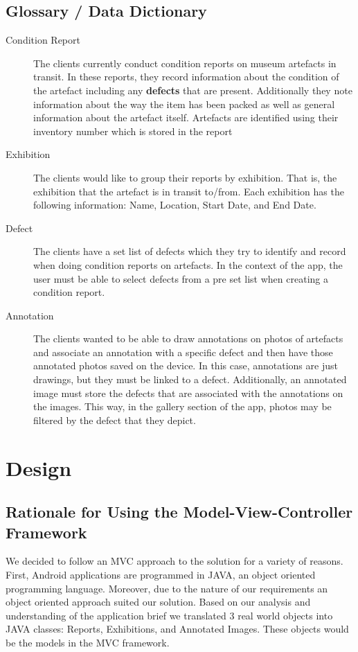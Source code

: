 \documentclass[12pt]{article}
\begin{document}
\subsection{Glossary / Data Dictionary}
\begin{description}
\item [Condition Report] The clients currently conduct condition reports on museum artefacts in transit. In these reports, they record information about the condition of the artefact including any \textbf{defects} that are present. Additionally they note information about the way the item has been packed as well as general information about the artefact itself. Artefacts are identified using their inventory number which is stored in the report

\item [Exhibition] The clients would like to group their reports by exhibition. That is, the exhibition that the artefact is in transit to/from. Each exhibition has the following information: Name, Location, Start Date, and End Date.

\item [Defect] The clients have a set list of defects which they try to identify and record when doing condition reports on artefacts. In the context of the app, the user must be able to select defects from a pre set list when creating a condition report.

\item [Annotation] The clients wanted to be able to draw annotations on photos of artefacts and associate an annotation with a specific defect and then have those annotated photos saved on the device. In this case, annotations are just drawings, but they must be linked to a defect. Additionally, an annotated image must store the defects that are associated with the annotations on the images. This way, in the gallery section of the app, photos may be filtered by the defect that they depict. 
\end{description}

\section{Design}
\subsection{Rationale for Using the Model-View-Controller Framework}
We decided to follow an MVC approach to the solution for a variety of reasons. First, Android applications are programmed in JAVA, an object oriented programming language. Moreover, due to the nature of our requirements an object oriented approach suited our solution. Based on our analysis and understanding of the application brief we translated 3 real world objects into JAVA classes: Reports, Exhibitions, and Annotated Images. These objects would be the models in the MVC framework.\\
\end{document}
